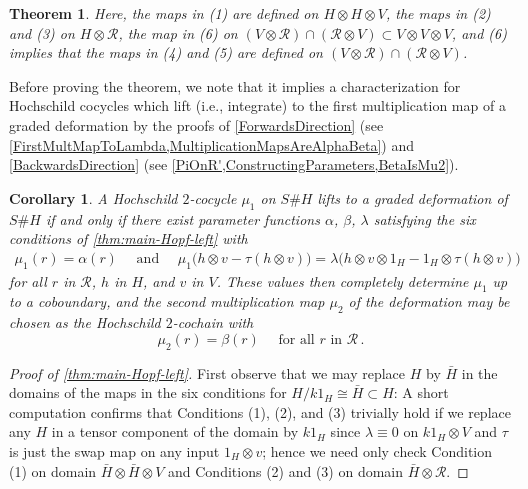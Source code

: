 \documentclass[11pt]{amsart}
\numberwithin{equation}{section}
\newtheorem{thm}[equation]{Theorem}
\newtheorem{cor}[equation]{Corollary}
\newcommand{\R}{\mathcal{R}}
\renewcommand{\_}[1]{\mbox{$_{\left( #1 \right)}$}}
\newcommand{\ot}{\otimes}
\begin{document}
{\begin{thm}
    Here, the maps in (1) are defined on $H\ot H\ot V$,
the maps in (2) and (3) on $H\ot \R$,
the map in (6) on $(V\ot \R)\cap (\R\ot V)
\subset V\ot V\ot V$, and (6) implies that the maps in (4) and (5) are
defined
on $(V\ot \R)\cap (\R\ot V)$.
  \end{thm}

  \vspace{2ex}
  
  Before proving the theorem, we note that it implies
  a characterization for Hochschild cocycles which lift (i.e.,
  integrate) to the first multiplication map of a graded deformation
  by the proofs of \cref{ForwardsDirection}
  (see
  \cref{FirstMultMapToLambda,MultiplicationMapsAreAlphaBeta})
  and \cref{BackwardsDirection}
  (see
 \cref{PiOnR',ConstructingParameters,BetaIsMu2}).
  \begin{cor}\label{WhichCocyclesLift}
      A Hochschild $2$-cocycle $\mu_1$ on $S\# H$
      lifts to a graded deformation of $S\#H$ if and only if there exist
      parameter functions $\alpha$, $\beta$, $\lambda$ satisfying
      the six conditions of \cref{thm:main-Hopf-left} with
      $$\begin{aligned}
      \mu_1(r) = \alpha(r)
      \quad\text{ and }\quad
      \mu_1\big(h\ot v - \tau(h\ot v)\big)
      = \lambda\big(h\ot v\ot 1_H -1_H\ot \tau(h\ot v)\big)
\end{aligned}
$$
for all $r$ in $\R$, $h$ in $H$, and $v$ in $V$.
%
These values then completely determine $\mu_1$
up to a coboundary,
and the second multiplication map $\mu_2$
of the deformation
may be chosen as the Hochschild $2$-cochain
with
$$
\mu_2(r)= \beta(r)
\quad \text{ for all }
r \text{ in } \R\, .
$$
 \end{cor}

 \vspace{2ex}
 
  \begin{proof}[Proof of \cref{thm:main-Hopf-left}]
    First observe that we may replace $H$ by $\bar H$ in the
    domains of the maps in the six
    conditions for $H/k1_H\cong \bar H\subset H$:
    A short computation confirms that Conditions (1), (2), and (3)
    trivially hold
    if we replace any $H$ in
    a tensor component of the domain
by $k1_H$ since $\lambda\equiv 0$ on $k1_H\ot V$
and
$\tau$ is just the swap map on any input $1_H\ot v$;
hence we need only check 
Condition (1)
   on domain $\bar H\ot \bar H \ot V$ and Conditions (2) and (3)
   on domain $\bar H\ot \R$.


\end{proof}}
\end{document}
